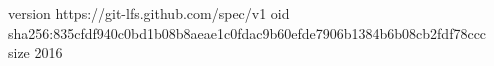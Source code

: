 version https://git-lfs.github.com/spec/v1
oid sha256:835cfdf940c0bd1b08b8aeae1c0fdac9b60efde7906b1384b6b08cb2fdf78ccc
size 2016
